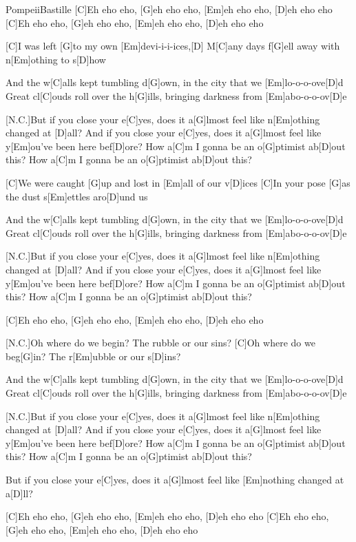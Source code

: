 \documentclass[../main.tex]{subfiles}
\begin{document}
\begin{song}[2]{Pompeii}{Bastille}{}
[C]Eh eho eho, [G]eh eho eho, [Em]eh eho eho, [D]eh eho eho
[C]Eh eho eho, [G]eh eho eho, [Em]eh eho eho, [D]eh eho eho

[C]I was left [G]to my own [Em]devi-i-i-ices,[D]{\hh} 
M[C]any days f[G]ell away with n[Em]othing to s[D]how

And the w[C]alls kept tumbling d[G]own, in the city that we [Em]lo-o-o-ove[D]d
Great cl[C]ouds roll over the h[G]ills, bringing darkness from [Em]abo-o-o-ov[D]e

[N.C.]But if you close your e[C]yes, does it a[G]lmost feel like n[Em]othing changed at [D]all?
And if you close your e[C]yes, does it a[G]lmost feel like y[Em]ou've been here bef[D]ore?
How a[C]m I gonna be an o[G]ptimist ab[D]out this? How a[C]m I gonna be an o[G]ptimist ab[D]out this?

[C]We were caught [G]up and lost in [Em]all of our v[D]ices
[C]In your pose [G]as the dust s[Em]ettles aro[D]und us

And the w[C]alls kept tumbling d[G]own, in the city that we [Em]lo-o-o-ove[D]d
Great cl[C]ouds roll over the h[G]ills, bringing darkness from [Em]abo-o-o-ov[D]e

[N.C.]But if you close your e[C]yes, does it a[G]lmost feel like n[Em]othing changed at [D]all?
And if you close your e[C]yes, does it a[G]lmost feel like y[Em]ou've been here bef[D]ore?
How a[C]m I gonna be an o[G]ptimist ab[D]out this? How a[C]m I gonna be an o[G]ptimist ab[D]out this?

[C]Eh eho eho, [G]eh eho eho, [Em]eh eho eho, [D]eh eho eho

[N.C.]Oh where do we begin? The rubble or our sins?
[C]Oh where do we beg[G]in? The r[Em]ubble or our s[D]ins?

And the w[C]alls kept tumbling d[G]own, in the city that we [Em]lo-o-o-ove[D]d
Great cl[C]ouds roll over the h[G]ills, bringing darkness from [Em]abo-o-o-ov[D]e

[N.C.]But if you close your e[C]yes, does it a[G]lmost feel like n[Em]othing changed at [D]all?
And if you close your e[C]yes, does it a[G]lmost feel like y[Em]ou've been here bef[D]ore?
How a[C]m I gonna be an o[G]ptimist ab[D]out this? How a[C]m I gonna be an o[G]ptimist ab[D]out this?

But if you close your e[C]yes, does it a[G]lmost feel like [Em]nothing changed at a[D]ll?

[C]Eh eho eho, [G]eh eho eho, [Em]eh eho eho, [D]eh eho eho
[C]Eh eho eho, [G]eh eho eho, [Em]eh eho eho, [D]eh eho eho
\end{song}
\end{document}
